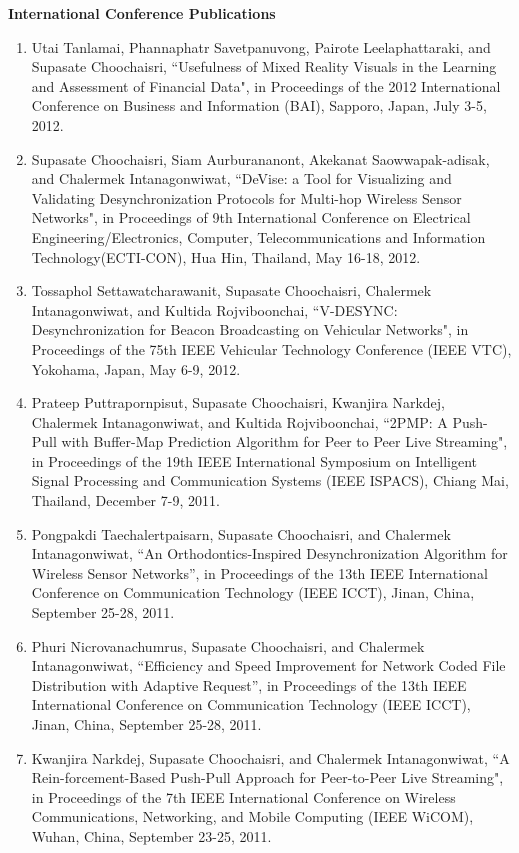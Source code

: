 {\flushleft\bfseries International Conference Publications}
\begin{enumerate}
\item Utai Tanlamai, Phannaphatr Savetpanuvong, Pairote Leelaphattaraki, and Supasate Choochaisri, ``Usefulness of Mixed Reality Visuals in the Learning and Assessment of Financial Data", in Proceedings of the 2012 International Conference on Business and Information (BAI), Sapporo, Japan, July 3-5, 2012.
\item Supasate Choochaisri, Siam Aurburananont, Akekanat Saowwapak-adisak, and Chalermek Intanagonwiwat, ``DeVise: a Tool for Visualizing and Validating Desynchronization Protocols for Multi-hop Wireless Sensor Networks", in Proceedings of 9th International Conference on Electrical Engineering/Electronics, Computer, Telecommunications and Information Technology(ECTI-CON), Hua Hin, Thailand, May 16-18, 2012.
\item Tossaphol Settawatcharawanit, Supasate Choochaisri, Chalermek Intanagonwiwat, and Kultida Rojviboonchai, ``V-DESYNC: Desynchronization for Beacon Broadcasting on Vehicular Networks", in Proceedings of the 75th IEEE Vehicular Technology Conference (IEEE VTC), Yokohama, Japan, May 6-9, 2012.
\item  Prateep Puttrapornpisut, Supasate Choochaisri, Kwanjira Narkdej, Chalermek Intanagonwiwat, and Kultida Rojviboonchai, ``2PMP: A Push-Pull with Buffer-Map Prediction Algorithm for Peer to Peer Live Streaming", in Proceedings of the 19th IEEE International Symposium on Intelligent Signal Processing and Communication Systems (IEEE ISPACS), Chiang Mai, Thailand, December 7-9, 2011.
\item Pongpakdi Taechalertpaisarn, Supasate Choochaisri, and Chalermek Intanagonwiwat, ``An Orthodontics-Inspired Desynchronization Algorithm for Wireless Sensor Networks”, in Proceedings of the 13th IEEE International Conference on Communication Technology (IEEE ICCT), Jinan, China, September 25-28, 2011.
\item  Phuri Nicrovanachumrus, Supasate Choochaisri, and Chalermek Intanagonwiwat, ``Efficiency and Speed Improvement for Network Coded File Distribution with Adaptive Request”, in Proceedings of the 13th IEEE International Conference on Communication Technology (IEEE ICCT), Jinan, China, September 25-28, 2011.
\item  Kwanjira Narkdej, Supasate Choochaisri, and Chalermek Intanagonwiwat, ``A Rein-forcement-Based Push-Pull Approach for Peer-to-Peer Live Streaming", in Proceedings of the 7th IEEE International Conference on Wireless Communications, Networking, and Mobile Computing (IEEE WiCOM), Wuhan, China, September 23-25, 2011.

\end{enumerate}
